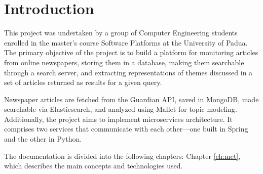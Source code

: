 \chapter{Introduction}\label{ch:in}
This project was undertaken by a group of Computer Engineering students enrolled in the master's
course Software Platforms at the University of Padua. The primary objective of the project is
to build a platform for monitoring articles from online newspapers, storing them in a database,
making them searchable through a search server, and extracting representations of themes discussed
in a set of articles returned as results for a given query.

Newspaper articles are fetched from the Guardian API, saved in MongoDB, made searchable via
Elasticsearch, and analyzed using Mallet for topic modeling. Additionally, the project aims to
implement microservices architecture. It comprises two services that communicate with each other—one
built in Spring and the other in Python.

The documentation is divided into the following chapters: Chapter \ref{ch:met}, which describes
the main concepts and technologies used.
